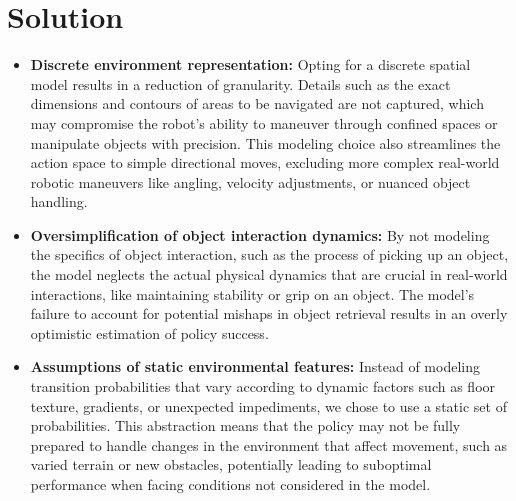 \documentclass[submit]{harvardml}
\newenvironment{solution}
  {\color{blue}\section*{Solution}}
{}
\begin{document}
\begin{solution}
\begin{enumerate}
\begin{itemize}
    \item \textbf{Discrete environment representation:} Opting for a discrete spatial model results in a reduction of granularity. Details such as the exact dimensions and contours of areas to be navigated are not captured, which may compromise the robot's ability to maneuver through confined spaces or manipulate objects with precision. This modeling choice also streamlines the action space to simple directional moves, excluding more complex real-world robotic maneuvers like angling, velocity adjustments, or nuanced object handling.

    \item \textbf{Oversimplification of object interaction dynamics:} By not modeling the specifics of object interaction, such as the process of picking up an object, the model neglects the actual physical dynamics that are crucial in real-world interactions, like maintaining stability or grip on an object. The model's failure to account for potential mishaps in object retrieval results in an overly optimistic estimation of policy success.

    \item \textbf{Assumptions of static environmental features:} Instead of modeling transition probabilities that vary according to dynamic factors such as floor texture, gradients, or unexpected impediments, we chose to use a static set of probabilities. This abstraction means that the policy may not be fully prepared to handle changes in the environment that affect movement, such as varied terrain or new obstacles, potentially leading to suboptimal performance when facing conditions not considered in the model.
\end{itemize}
\end{enumerate}
\end{solution}


\newpage
\end{document}
